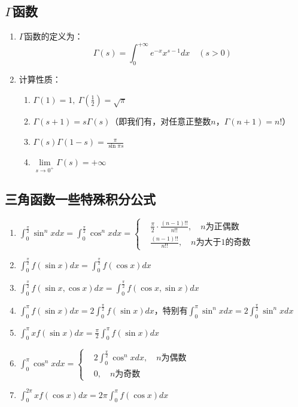 \documentclass[12pt,a4paper,UTF8]{book}
\begin{document}
\subsection{$\Gamma$函数}
\begin{enumerate}
\item $\Gamma$函数的定义为：
\[\Gamma\left(s\right)=\int_{0}^{+\infty}e^{-x}x^{s-1}dx\quad\left(s>0\right)\]
\item 计算性质：
\begin{enumerate}
\item $\Gamma\left(1\right)=1,\ \Gamma\left(\frac{1}{2}\right)=\sqrt{\pi}$
\item $\Gamma\left(s+1\right)=s\Gamma\left(s\right)$（即我们有，对任意正整数$n$，$\Gamma\left(n+1\right)=n!$）
\item $\Gamma\left(s\right)\Gamma\left(1-s\right)=\frac{\pi}{\sin\pi s}$
\item $\lim\limits_{s\to 0^{+}}\Gamma\left(s\right)=+\infty$
\end{enumerate}
\end{enumerate}

\subsection{三角函数一些特殊积分公式}
\begin{enumerate}
\item $\int_0^{\frac{\pi}{2}}\sin^nxdx=\int_0^{\frac{\pi}{2}}\cos^nxdx=
\left\{\begin{aligned}
&\frac{\pi}{2}\cdot\frac{\left(n-1\right)!!}{n!!},\quad n\text{为正偶数}\\
&\frac{\left(n-1\right)!!}{n!!},\quad n\text{为大于1的奇数}
\end{aligned}\right.$
\item $\int_0^{\frac{\pi}{2}}f\left(\sin x\right)dx=\int_0^{\frac{\pi}{2}}f\left(\cos x\right)dx$
\item $\int_0^{\frac{\pi}{2}}f\left(\sin x,\cos x\right)dx=\int_0^{\frac{\pi}{2}}f\left(\cos x,\sin x\right)dx$
\item $\int_0^{\pi}f\left(\sin x\right)dx=2\int_0^{\frac{\pi}{2}}f\left(\sin x\right)dx$，特别有$\int_0^{\pi}\sin^nxdx=2\int_0^{\frac{\pi}{2}}\sin^nxdx$
\item $\int_0^{\pi}xf\left(\sin x\right)dx=\frac{\pi}{2}\int_0^{\pi}f\left(\sin x\right)dx$
\item $\int_0^{\pi}\cos^nxdx=
\left\{\begin{aligned}
&2\int_0^{\frac{\pi}{2}}\cos^nxdx,\quad n\text{为偶数}\\
&0,\quad n\text{为奇数}
\end{aligned}\right.$
\item $\int_0^{2\pi}xf\left(\cos x\right)dx=2\pi\int_0^{\pi}f\left(\cos x\right)dx$
\end{enumerate}
\end{document}
